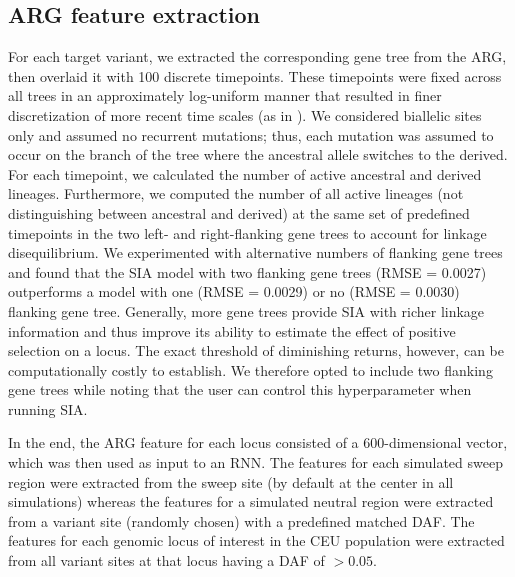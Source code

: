 \subsection{ARG feature extraction} \label{fea-xtract}
For each target variant, we extracted the corresponding gene tree from the \ac{ARG}, then overlaid it with 100 discrete timepoints. These timepoints were fixed across all trees in an approximately log-uniform manner that resulted in finer discretization of more recent time scales (as in \cite{rasmussen_genome-wide_2014}). We considered biallelic sites only and assumed no recurrent mutations; thus, each mutation was assumed to occur on the branch of the tree where the ancestral allele switches to the derived. For each timepoint, we calculated the number of active ancestral and derived lineages. Furthermore, we computed the number of all active lineages (not distinguishing between ancestral and derived) at the same set of predefined timepoints in the two left- and right-flanking gene trees to account for linkage disequilibrium. We experimented with alternative numbers of flanking gene trees and found that the \ac{SIA} model with two flanking gene trees (\ac{RMSE} = 0.0027) outperforms a model with one (\ac{RMSE} = 0.0029) or no (\ac{RMSE} = 0.0030) flanking gene tree. Generally, more gene trees provide \ac{SIA} with richer linkage information and thus improve its ability to estimate the effect of positive selection on a locus. The exact threshold of diminishing returns, however, can be computationally costly to establish. We therefore opted to include two flanking gene trees while noting that the user can control this hyperparameter when running \ac{SIA}.

In the end, the \ac{ARG} feature for each locus consisted of a 600-dimensional vector, which was then used as input to an \ac{RNN}. The features for each simulated sweep region were extracted from the sweep site (by default at the center in all simulations) whereas the features for a simulated neutral region were extracted from a variant site (randomly chosen) with a predefined matched \ac{DAF}. The features for each genomic locus of interest in the CEU population were extracted from all variant sites at that locus having a \ac{DAF} of $>0.05$.


